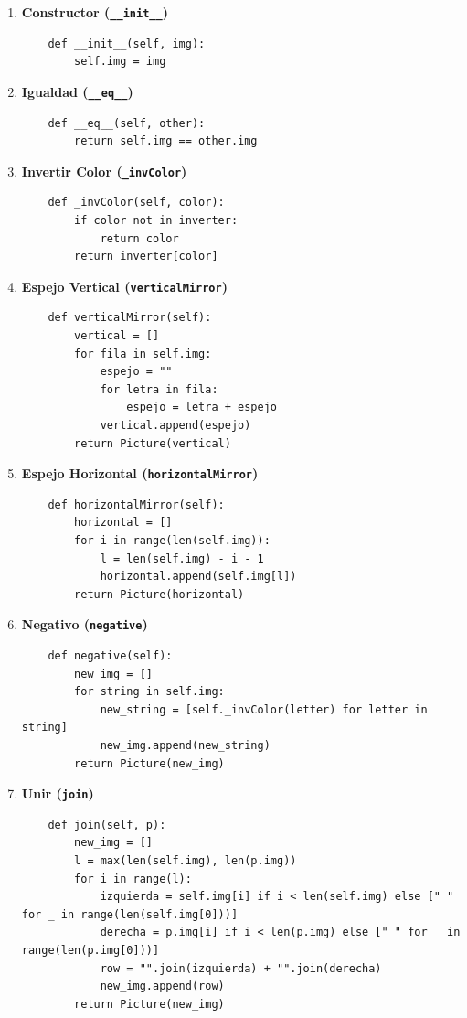 \begin{enumerate}
    \item \textbf{Constructor (\texttt{\_\_init\_\_})}
    \begin{lstlisting}
    def __init__(self, img):
        self.img = img
    \end{lstlisting}

    \item \textbf{Igualdad (\texttt{\_\_eq\_\_})}
    \begin{lstlisting}
    def __eq__(self, other):
        return self.img == other.img
    \end{lstlisting}

    \item \textbf{Invertir Color (\texttt{\_invColor})}
    \begin{lstlisting}
    def _invColor(self, color):
        if color not in inverter:
            return color
        return inverter[color]
    \end{lstlisting}

    \item \textbf{Espejo Vertical (\texttt{verticalMirror})}
    \begin{lstlisting}
    def verticalMirror(self):
        vertical = []
        for fila in self.img:
            espejo = ""
            for letra in fila:
                espejo = letra + espejo
            vertical.append(espejo)
        return Picture(vertical)
    \end{lstlisting}

    \item \textbf{Espejo Horizontal (\texttt{horizontalMirror})}
    \begin{lstlisting}
    def horizontalMirror(self):
        horizontal = []
        for i in range(len(self.img)):
            l = len(self.img) - i - 1
            horizontal.append(self.img[l])
        return Picture(horizontal)
    \end{lstlisting}

    \item \textbf{Negativo (\texttt{negative})}
    \begin{lstlisting}
    def negative(self):
        new_img = []
        for string in self.img:
            new_string = [self._invColor(letter) for letter in string]
            new_img.append(new_string)
        return Picture(new_img)
    \end{lstlisting}

    \item \textbf{Unir (\texttt{join})}
    \begin{lstlisting}
    def join(self, p):
        new_img = []
        l = max(len(self.img), len(p.img))
        for i in range(l):
            izquierda = self.img[i] if i < len(self.img) else [" " for _ in range(len(self.img[0]))]
            derecha = p.img[i] if i < len(p.img) else [" " for _ in range(len(p.img[0]))]
            row = "".join(izquierda) + "".join(derecha)
            new_img.append(row)
        return Picture(new_img)
    \end{lstlisting}


\end{enumerate}
